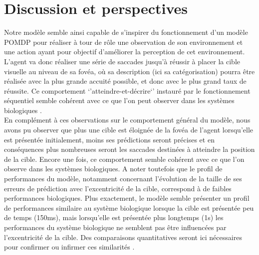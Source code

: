 
\chapter{Discussion et perspectives} %

\label{Discussion} %

Notre modèle semble ainsi capable de s'inspirer du fonctionnement d'un modèle POMDP pour réaliser à tour de rôle une observation de son environnement et une action ayant pour objectif d'améliorer la perception de cet environnement.
L'agent va donc réaliser une série de saccades jusqu'à réussir à placer la cible visuelle au niveau de sa fovéa, où sa description (ici sa catégorisation) pourra être réalisée avec la plus grande accuité possible, et donc avec le plus grand taux de réussite. Ce comportement `'atteindre-et-décrire`' instauré par le fonctionnement séquentiel semble cohérent avec ce que l'on peut observer dans les systèmes biologiques \autocite{Werner2014, Najemnik2005}. \\
En complément à ces observations sur le comportement général du modèle, nous avons pu observer que plus une cible est éloignée de la fovéa de l'agent lorsqu'elle est présentée initialement, moins ses prédictions seront précises et en conséquences plus nombreuses seront les saccades destinées à atteindre la position de la cible. 
Encore une fois, ce comportement semble cohérent avec ce que l'on observe dans les systèmes biologiques. 
A noter toutefois que le profil de performances du modèle, notamment concernant l'évolution de la taille de ses erreurs de prédiction avec l'excentricité de la cible, correspond à de faibles performances biologiques. 
Plus exactement, le modèle semble présenter un profil de performances similaire au système biologique lorsque la cible est présentée peu de temps (150ms), mais lorsqu'elle est présentée plus longtemps (1s) les performances du système biologique ne semblent pas être influencées par l'excentricité de la cible. Des comparaisons quantitatives seront ici nécessaires pour confirmer ou infirmer ces similarités \autocite{Uddin2004}.\\

	
